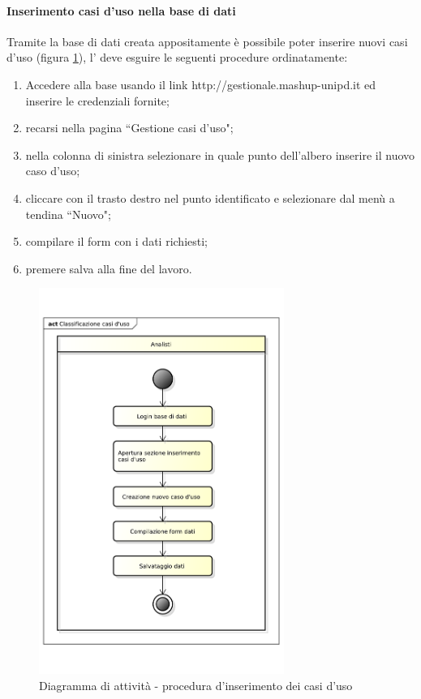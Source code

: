 			\paragraph{Inserimento casi d'uso nella base di dati}
			Tramite la base di dati creata appositamente è possibile poter inserire nuovi casi d'uso (figura \ref{fig:procedura_inserimento_uc}), l'\roleAnalyst{} deve esguire le seguenti procedure ordinatamente:

				\begin{enumerate}
			 		\item Accedere alla base usando il link http://gestionale.mashup-unipd.it ed inserire le credenziali fornite;
			 		\item recarsi nella pagina ``Gestione casi d'uso";
					\item nella colonna di sinistra selezionare in quale punto dell'albero inserire il nuovo caso d'uso;
					\item cliccare con il trasto destro nel punto identificato e selezionare dal menù a tendina ``Nuovo";
					\item compilare il form con i dati richiesti;
					\item premere salva alla fine del lavoro.
			 	\end{enumerate}

			 	\begin{figure}
					\centering
					\includegraphics[width=8cm]{images/classificazione_uc.pdf}
					\caption{Diagramma di attività - procedura d'inserimento dei casi d'uso}
					\label{fig:procedura_inserimento_uc}
				\end{figure}


